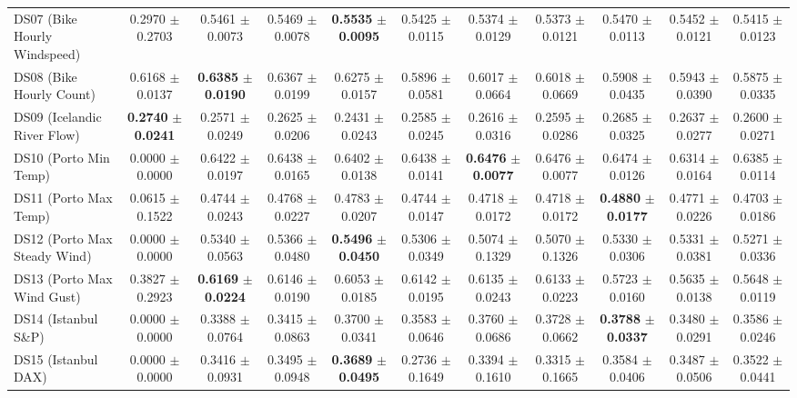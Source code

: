 \begin{table}[t]
{{\begin{tabular}{lcccccccccc}
DS07 (Bike Hourly Windspeed) & 0.2970 $\pm$ 0.2703 & 0.5461 $\pm$ 0.0073 & 0.5469 $\pm$ 0.0078 & \textbf{0.5535} $\pm$ \textbf{0.0095} & 0.5425 $\pm$ 0.0115 & 0.5374 $\pm$ 0.0129 & 0.5373 $\pm$ 0.0121 & 0.5470 $\pm$ 0.0113 & 0.5452 $\pm$ 0.0121 & 0.5415 $\pm$ 0.0123 \\
DS08 (Bike Hourly Count) & 0.6168 $\pm$ 0.0137 & \textbf{0.6385} $\pm$ \textbf{0.0190} & 0.6367 $\pm$ 0.0199 & 0.6275 $\pm$ 0.0157 & 0.5896 $\pm$ 0.0581 & 0.6017 $\pm$ 0.0664 & 0.6018 $\pm$ 0.0669 & 0.5908 $\pm$ 0.0435 & 0.5943 $\pm$ 0.0390 & 0.5875 $\pm$ 0.0335 \\
DS09 (Icelandic River Flow) & \textbf{0.2740} $\pm$ \textbf{0.0241} & 0.2571 $\pm$ 0.0249 & 0.2625 $\pm$ 0.0206 & 0.2431 $\pm$ 0.0243 & 0.2585 $\pm$ 0.0245 & 0.2616 $\pm$ 0.0316 & 0.2595 $\pm$ 0.0286 & 0.2685 $\pm$ 0.0325 & 0.2637 $\pm$ 0.0277 & 0.2600 $\pm$ 0.0271 \\
DS10 (Porto Min Temp) & 0.0000 $\pm$ 0.0000 & 0.6422 $\pm$ 0.0197 & 0.6438 $\pm$ 0.0165 & 0.6402 $\pm$ 0.0138 & 0.6438 $\pm$ 0.0141 & \textbf{0.6476} $\pm$ \textbf{0.0077} & 0.6476 $\pm$ 0.0077 & 0.6474 $\pm$ 0.0126 & 0.6314 $\pm$ 0.0164 & 0.6385 $\pm$ 0.0114 \\
DS11 (Porto Max Temp) & 0.0615 $\pm$ 0.1522 & 0.4744 $\pm$ 0.0243 & 0.4768 $\pm$ 0.0227 & 0.4783 $\pm$ 0.0207 & 0.4744 $\pm$ 0.0147 & 0.4718 $\pm$ 0.0172 & 0.4718 $\pm$ 0.0172 & \textbf{0.4880} $\pm$ \textbf{0.0177} & 0.4771 $\pm$ 0.0226 & 0.4703 $\pm$ 0.0186 \\
DS12 (Porto Max Steady Wind) & 0.0000 $\pm$ 0.0000 & 0.5340 $\pm$ 0.0563 & 0.5366 $\pm$ 0.0480 & \textbf{0.5496} $\pm$ \textbf{0.0450} & 0.5306 $\pm$ 0.0349 & 0.5074 $\pm$ 0.1329 & 0.5070 $\pm$ 0.1326 & 0.5330 $\pm$ 0.0306 & 0.5331 $\pm$ 0.0381 & 0.5271 $\pm$ 0.0336 \\
DS13 (Porto Max Wind Gust) & 0.3827 $\pm$ 0.2923 & \textbf{0.6169} $\pm$ \textbf{0.0224} & 0.6146 $\pm$ 0.0190 & 0.6053 $\pm$ 0.0185 & 0.6142 $\pm$ 0.0195 & 0.6135 $\pm$ 0.0243 & 0.6133 $\pm$ 0.0223 & 0.5723 $\pm$ 0.0160 & 0.5635 $\pm$ 0.0138 & 0.5648 $\pm$ 0.0119 \\
DS14 (Istanbul S\&P) & 0.0000 $\pm$ 0.0000 & 0.3388 $\pm$ 0.0764 & 0.3415 $\pm$ 0.0863 & 0.3700 $\pm$ 0.0341 & 0.3583 $\pm$ 0.0646 & 0.3760 $\pm$ 0.0686 & 0.3728 $\pm$ 0.0662 & \textbf{0.3788} $\pm$ \textbf{0.0337} & 0.3480 $\pm$ 0.0291 & 0.3586 $\pm$ 0.0246 \\
DS15 (Istanbul DAX) & 0.0000 $\pm$ 0.0000 & 0.3416 $\pm$ 0.0931 & 0.3495 $\pm$ 0.0948 & \textbf{0.3689} $\pm$ \textbf{0.0495} & 0.2736 $\pm$ 0.1649 & 0.3394 $\pm$ 0.1610 & 0.3315 $\pm$ 0.1665 & 0.3584 $\pm$ 0.0406 & 0.3487 $\pm$ 0.0506 & 0.3522 $\pm$ 0.0441 \\

\end{tabular}}}
\end{table}
